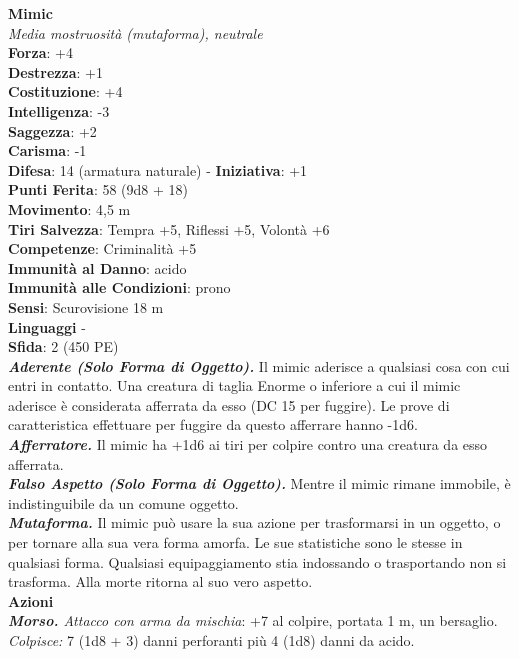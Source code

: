 \begin{multicols}{2}
\medskip\textbf{Mimic}\\
\emph{Media mostruosità (mutaforma), neutrale}\\
\textbf{Forza}: +4\\
\textbf{Destrezza}: +1\\
\textbf{Costituzione}: +4\\
\textbf{Intelligenza}: -3\\
\textbf{Saggezza}: +2\\
\textbf{Carisma}: -1\\
\textbf{Difesa}: 14 (armatura naturale) - \textbf{Iniziativa}: +1\\
\textbf{Punti Ferita}: 58 (9d8 + 18)\\
\textbf{Movimento}: 4,5 m\\
\textbf{Tiri Salvezza}: Tempra +5, Riflessi +5, Volontà +6\\
\textbf{Competenze}: Criminalità +5\\
\textbf{Immunità al Danno}: acido\\
\textbf{Immunità alle Condizioni}: prono\\
\textbf{Sensi}: Scurovisione 18 m\\
\textbf{Linguaggi} -\\
\textbf{Sfida}: 2 (450 PE)\smallskip\\
\emph{\textbf{Aderente (Solo Forma di Oggetto).}} Il mimic aderisce a qualsiasi cosa con cui entri in contatto. Una creatura di taglia Enorme o inferiore a cui il mimic aderisce è considerata afferrata da esso (DC  15 per fuggire). Le prove di caratteristica effettuare per fuggire da questo afferrare hanno -1d6.\\
\emph{\textbf{Afferratore.}} Il mimic ha +1d6 ai tiri per colpire contro una creatura da esso afferrata.\\
\emph{\textbf{Falso Aspetto (Solo Forma di Oggetto).}} Mentre il mimic rimane immobile, è indistinguibile da un comune oggetto.\\
\emph{\textbf{Mutaforma.}} Il mimic può usare la sua azione per trasformarsi in un oggetto, o per tornare alla sua vera forma amorfa. Le sue statistiche sono le stesse in qualsiasi forma. Qualsiasi equipaggiamento stia indossando o trasportando non si trasforma. Alla morte ritorna al suo vero aspetto.\\
\smallskip\textbf{Azioni}\\
\emph{\textbf{Morso.} Attacco con arma da mischia}: +7 al colpire, portata 1 m, un bersaglio.\\
\emph{Colpisce:} 7 (1d8 + 3) danni perforanti più 4 (1d8) danni da acido.\\

\end{multicols}
